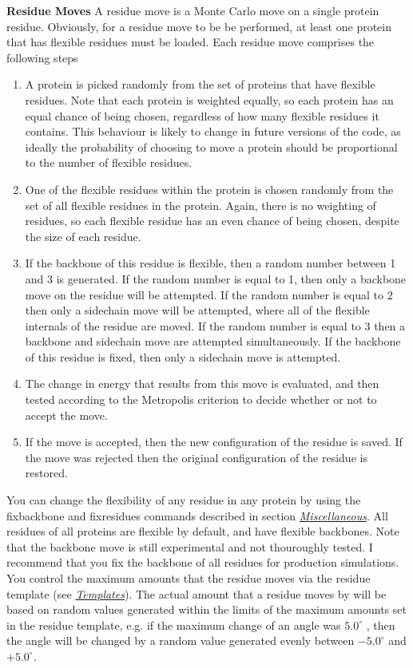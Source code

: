 \documentclass[letterpaper,10pt,english]{sphinxmanual}
\begin{document}
\textbf{Residue Moves}
A residue move is a Monte Carlo move on a single protein residue. Obviously, for a residue move to be be performed, at least one protein that has flexible residues must be loaded. Each residue move comprises the following steps
\begin{enumerate}
\item {} 
A protein is picked randomly from the set of proteins that have flexible residues. Note that each protein is weighted equally, so each protein has an equal chance of being chosen, regardless of how many flexible residues it contains. This behaviour is likely to change in future versions of the code, as ideally the probability of choosing to move a protein should be proportional to the number of flexible residues.

\item {} 
One of the flexible residues within the protein is chosen randomly from the set of all flexible residues in the protein. Again, there is no weighting of residues, so each flexible residue has an even chance of being chosen, despite the size of each residue.

\item {} 
If the backbone of this residue is flexible, then a random number between 1 and 3 is generated. If the random number is equal to 1, then only a backbone move on the residue will be attempted. If the random number is equal to 2 then only a sidechain move will be attempted, where all of the flexible internals of the residue are moved. If the random number is equal to 3 then a backbone and sidechain move are attempted simultaneously. If the backbone of this residue is fixed, then only a sidechain move is attempted.

\item {} 
The change in energy that results from this move is evaluated, and then tested according to the Metropolis criterion to decide whether or not to accept the move.

\item {} 
If the move is accepted, then the new configuration of the residue is saved. If the move was rejected then the original configuration of the residue is restored.

\end{enumerate}

You can change the flexibility of any residue in any protein by using the fixbackbone and fixresidues commands described in section {\hyperref[protoms:misccmd]{\emph{Miscellaneous}}}. All residues of all proteins are flexible by default, and have flexible backbones. Note that the backbone move is still experimental and not thouroughly tested. I recommend that you fix the backbone of all residues for production simulations. You control the maximum amounts that the residue moves via the residue template (see {\hyperref[protoms:temref]{\emph{Templates}}}). The actual amount that a residue moves by will be based on random values generated within the limits of the maximum amounts set in the residue template, e.g. if the maximum change of an angle was \(5.0^\circ\) , then the angle will be changed by a random value generated evenly between \(-5.0^\circ\) and \(+5.0^\circ\).
\end{document}
